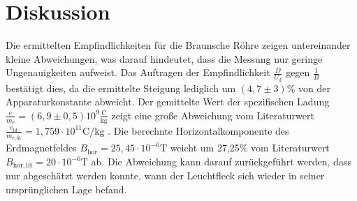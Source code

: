 \section{Diskussion}
\label{sec:Diskussion}
Die ermittelten Empfindlichkeiten für die Braunsche Röhre zeigen untereinander kleine Abweichungen, was darauf hindeutet, dass die Messung nur geringe Ungenauigkeiten aufweist.
Das Auftragen der Empfindlichkeit $\frac{D}{U_\mathrm{d}}$ gegen $\frac{1}{B}$ bestätigt dies, da die ermittelte Steigung lediglich um $(4,7 \pm3)\%$ von der Apparaturkonstante abweicht.
Der gemittelte Wert der spezifischen Ladung $\frac{e}{m_\mathrm{e}}=(6,9 \pm 0,5)10^9 \frac{\si{\coulomb}}{\si{\kilo\gram}}$ zeigt eine große Abweichung vom Literaturwert $\frac{e_\mathrm{lit}}{m_\mathrm{e, lit}}=1,759 \cdot 10^
{11} \si{\coulomb\per\kilo\gram}$ \cite{formelsammlung}.
Die  berechnte Horizontalkomponente des Erdmagnetfeldes $B_\mathrm{hor}=25,45 \cdot 10^{-6} \si{\tesla}$ weicht um 27,25\% vom Literaturwert $B_\mathrm{hor,lit}=20 \cdot 10^{-6} \si{\tesla}$ \cite{dornbader} ab. Die Abweichung kann darauf zurückgeführt werden, dass nur abgeschätzt werden konnte, wann der Leuchtfleck sich wieder in seiner ursprünglichen Lage befand.
